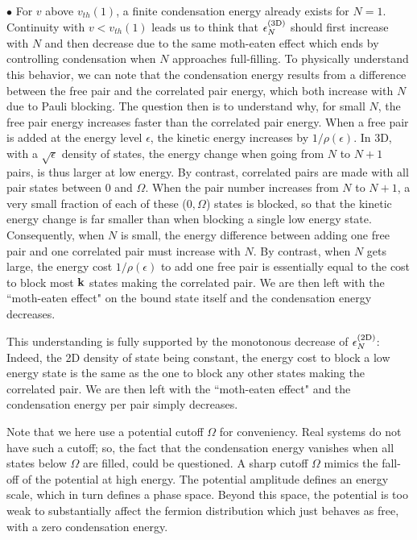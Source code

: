 \documentclass[5p,twocolumn]{elsarticle}
\begin{document}
$\bullet$  For $v$ above $v_{th}(1)$, a finite condensation energy already exists for $N=1$. Continuity with $v<v_{th}(1)$ leads us to think that $\epsilon^{{\text{(3D)}}}_N$ should first increase with $N$ and then decrease due to the same moth-eaten effect which ends by controlling condensation when $N$ approaches full-filling. 
To physically understand this behavior, we can note that the condensation energy results from a difference between the free pair and the correlated pair energy, which both increase with $N$ due to Pauli blocking.  The question then is to understand why, for small $N$, the free pair energy increases faster than the correlated pair energy. When a free pair is added at the energy level $\epsilon$, the kinetic energy increases by $1/\rho(\epsilon)$.  In 3D, with a $\sqrt{\epsilon}$ density of states, the energy change when going from $N$ to $N+1$ pairs, is thus larger at low energy. By contrast, correlated pairs are made with all pair states between $0$ and $\Omega$. When the pair number increases from $N$ to $N+1$, a very small fraction of each of these ($0,\Omega$) states is blocked, so that the kinetic energy change is far smaller than when blocking a single low energy state.  Consequently, when $N$ is small,  the energy difference between adding one free pair and one correlated pair must increase with $N$. By contrast, when $N$ gets large, the energy cost $1/\rho(\epsilon)$ to add one free pair is essentially equal to the cost to block most $\mathbf{k}$ states making the correlated pair.  We are then left with the ``moth-eaten effect" on the bound state itself and the condensation energy decreases. 

This understanding is fully supported by the monotonous decrease of $\epsilon^{{\text{(2D)}}}_N$: Indeed, the 2D density of state being constant, the energy cost to block a low energy state is the same as the one to block  any other states making the correlated pair. We are then left with the ``moth-eaten effect" and the condensation energy per pair simply decreases.

Note that we here use a potential cutoff $\Omega$ for conveniency.  Real systems do not have such a cutoff; so,   the fact that the condensation energy vanishes when all states below $\Omega$ are filled, could be questioned.  A sharp cutoff $\Omega$ mimics the fall-off of the potential at high energy.  The potential amplitude defines an energy scale, which in turn defines a phase space.  Beyond this space, the potential is too weak to substantially affect the fermion distribution which just behaves as free, with a zero condensation energy. 
\end{document}
